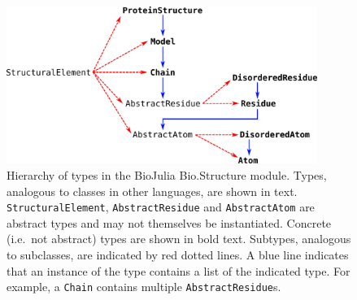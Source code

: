 \begin{figure}
\centering

\includegraphics[width=0.9\textwidth]{figures/model_structure/model_structure}

\caption[Hierarchy of types in the BioJulia Bio.Structure module]
{Hierarchy of types in the BioJulia Bio.Structure module.
Types, analogous to classes in other languages, are shown in text.
\texttt{StructuralElement}, \texttt{AbstractResidue} and \texttt{AbstractAtom} are abstract types and may not themselves be instantiated.
Concrete (i.e.\ not abstract) types are shown in bold text.
Subtypes, analogous to subclasses, are indicated by red dotted lines.
A blue line indicates that an instance of the type contains a list of the indicated type.
For example, a \texttt{Chain} contains multiple \texttt{AbstractResidue}s.}

\label{fig:model_structure}
\end{figure}


